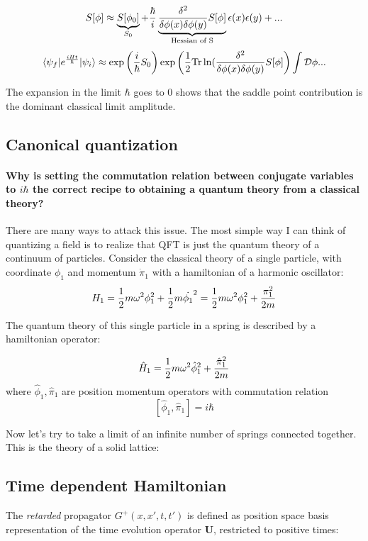 \documentclass[11pt]{article}
\theoremstyle{definition}
\begin{document}
$$S[\phi] \approx \underbrace{S[\phi_0]}_{S_0} + {\hbar \over i} \underbrace {{\delta^2 \over \delta \phi(x) \delta \phi(y)} S[\phi]}_{\text{Hessian of S}} \epsilon(x) \epsilon(y) + ...$$
$$ \braket{\psi_f | e^{i Ht \over \hbar} | \psi_i} \approx \exp\left({i \over \hbar} S_0 \right) \exp \left(\frac12 \text{Tr} \ln({\delta^2 \over \delta \phi(x) \delta \phi(y)} S[\phi]\right) \int \mathcal{D}\phi \text{...} $$

The expansion in the limit $\hbar$ goes to 0 shows that the saddle point contribution is the dominant classical limit amplitude.


\subsection{Canonical quantization}

\paragraph{Why is setting the commutation relation between conjugate variables to $i \hbar$ the correct recipe to obtaining a quantum theory from a classical theory?}

There are many ways to attack this issue.  The most simple way I can think of quantizing a field is to realize that QFT is just the quantum theory of a continuum of particles.  Consider the classical theory of a single particle, with coordinate $\phi_1$ and momentum $\dot{\pi}_1$ with a hamiltonian of a harmonic oscillator:
$$H_1 = \frac12 m \omega^2 \phi_1^2 + \frac12 m \dot{\phi_1}^2 = \frac12 m \omega^2 \phi_1^2 + {\pi_1^2 \over 2 m} $$

The quantum theory of this single particle in a spring is described by a hamiltonian operator:

$$\hat{H}_1 = \frac12 m \omega^2 \hat{\phi}_1^2 + {\hat{\pi}_1^2 \over 2 m}$$
where $\hat{\phi}_1, \hat{\pi}_1$ are position momentum operators with commutation relation
$$ [\hat{\phi}_1, \hat{\pi}_1] = i \hbar$$


Now let's try to take a limit of an infinite number of springs connected together.  This is the theory of a solid lattice:

\subsection{Time dependent Hamiltonian}

The \emph{retarded} propagator $G^+(x, x', t, t')$ is defined as position space basis representation of the time evolution operator $\mathbf{U}$, restricted to positive times:
\end{document}
